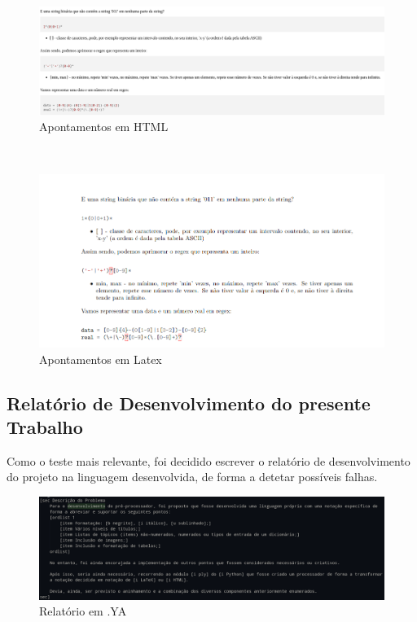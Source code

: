 \documentclass{article}
\begin{document}
\begin{figure}[!ht]
\centering
\includegraphics[width=\textwidth]{images/apontamentosHTML.png}
\caption{Apontamentos em HTML}
\end{figure}
\\
 
\begin{figure}[!ht]
\centering
\includegraphics[width=\textwidth]{images/apontamentosTEX.png}
\caption{Apontamentos em Latex}
\end{figure}
 \clearpage
 \subsection{Relatório de Desenvolvimento do presente Trabalho}
Como o teste mais relevante, foi decidido escrever o relatório de desenvolvimento do projeto na linguagem desenvolvida, de forma a detetar possíveis falhas.\\
 
\begin{figure}[!ht]
\centering
\includegraphics[width=\textwidth]{images/relatorioYA.png}
\caption{Relatório em .YA}
\end{figure}
\\
 
\end{document}
